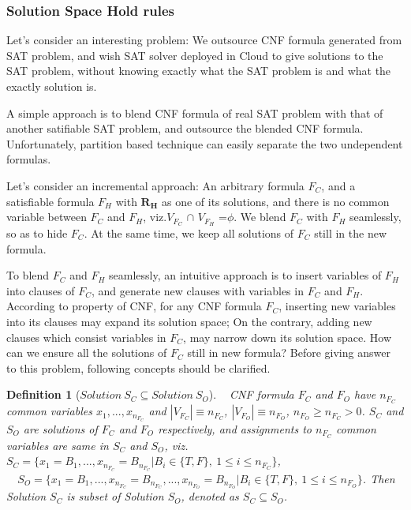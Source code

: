 \documentclass[conference]{IEEEtran}
\newtheorem{definition}{\textbf{Definition}}
\begin{document}
\subsubsection{Solution Space Hold rules}\label{embeded rules}
Let's consider an interesting problem:
We outsource CNF formula generated from SAT problem, 
and wish SAT solver deployed in Cloud to give solutions to the SAT problem,
without knowing exactly what the SAT problem is and what the exactly solution is.

A simple approach is to blend CNF formula of real SAT problem with that of another satifiable SAT problem,
and outsource the blended CNF formula.
Unfortunately, partition based technique \cite{Partition} can easily separate the two undependent formulas. 

Let's consider an incremental approach:
An arbitrary formula $F_C$,
and a satisfiable formula $F_H$ with \textsl{${\textbf{R}}_{\textbf{H}}$} as one of its solutions,
and there is no common variable between $F_C$ and $F_H$, viz.$V_{F_C}$ $\cap$ $V_{F_H}$ =$\phi$.
We blend $F_C$ with $F_H$ seamlessly, so as to hide $F_C$.
At the same time, we keep all solutions of $F_C$ still in the new formula. 

To blend $F_C$ and $F_H$ seamlessly,
an intuitive approach is to insert variables of $F_H$ into clauses of $F_C$, 
and generate new clauses with variables in $F_C$ and $F_H$. According to property of CNF, for any CNF formula $F_C$, 
inserting new variables into its clauses may expand its solution space; 
On the contrary,
adding new clauses which consist variables in $F_C$,
may narrow down its solution space. 
How can we ensure all the solutions of $F_C$ still in new formula?
Before giving answer to this problem,
following concepts should be clarified.

\begin{definition}[$ Solution~S_C \subseteq Solution~S_O$]~
CNF formula $F_C$ and $F_O$ have $n_{F_C}$ common variables $x_1,...,x_{n_{F_C}}$ and
$|V_{F_C}|\equiv n_{F_C}$, $|V_{F_O}|\equiv n_{F_O}$, $ n_{F_O}\geqslant n_{F_C} > 0$.
$S_C$ and $S_O$ are solutions of $F_C$ and $F_O$ respectively, 
and assignments to $n_{F_C}$ common variables are same in $S_C$ and $S_O$, viz.
~~$S_C=\{x_1=B_1,...,x_{n_{F_C}}=B_{n_{F_C}} | B_i \in \{T,F\},~1\leqslant i\leqslant n_{F_C} \}$,\\
~~$S_O=\{x_1=B_1,...,x_{n_{F_C}}=B_{n_{F_C}},...,x_{n_{F_O}}=B_{n_{F_O}}|B_i\in \{T,F\},~ 1\leqslant i\leqslant n_{F_O} \}$.
Then Solution $S_C$ is subset of Solution $S_O$,
denoted as $S_C \subseteq S_O$.
\end{definition}
\end{document}
